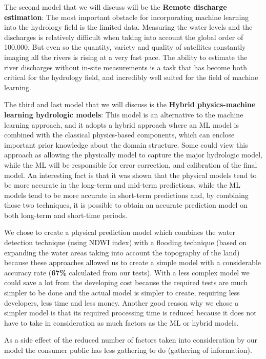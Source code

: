 \documentclass[12pt, a4paper]{report}
\begin{document}
The second model that we will discuss will be the \textbf{Remote discharge estimation}: The most important obstacle for incorporating machine learning into the hydrology field is the limited data. Measuring the water levels and the discharges is relatively difficult when taking into account the global order of 100,000. But even so the quantity, variety and quality of satellites constantly imaging all the rivers is rising at a very fast pace. The ability to estimate the river discharges without in-site measurements is a task that has become both critical for the hydrology field, and incredibly well suited for the field of machine learning.
\par 

The third and last model that we will discuss is the \textbf{Hybrid physics-machine learning hydrologic models}: This model is an alternative to the machine learning approach, and it adopts a hybrid approach where an ML model is combined with the classical physics-based components, which can enclose important prior knowledge about the domain structure. Some could view this approach as allowing the physically model to capture the major hydrologic  model, while the ML will be responsible for error correction, and calibration of the final model. An interesting fact is that it was shown that the physical models tend to be more accurate in the long-term and mid-term predictions, while the ML models tend to be more accurate in short-term predictions and, by combining those two techniques, it is possible to obtain an accurate prediction model on both long-term and short-time periods.
\par 

We chose to create a physical prediction model which combines the water detection technique (using NDWI index) with a flooding technique (based on expanding the water areas taking into account the topography of the land) because these approaches allowed us to create a simple model with a considerable accuracy rate (\textbf{67\%} calculated from our tests). With a less complex model we could save a lot from the developing cost because the required tests are much simpler to be done and the actual model is simpler to create, requiring less developers, less time and less money. Another good reason why we chose a simpler model is that its required processing time is reduced because it does not have to take in consideration as much factors as the ML or hybrid models. 
\par 

As a side effect of the reduced number of factors taken into consideration  by our model the consumer public has less gathering to do (gathering of information).
\end{document}
